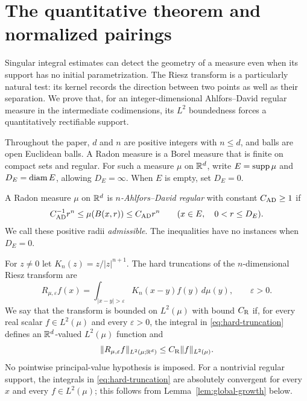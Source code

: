 \section{The quantitative theorem and normalized pairings}
\label{sec:background}

Singular integral estimates can detect the geometry of a measure even
when its support has no initial parametrization. The Riesz transform is
a particularly natural test: its kernel records the direction between
two points as well as their separation. We prove that, for an
integer-dimensional Ahlfors--David regular measure in the intermediate
codimensions, its $L^2$ boundedness forces a quantitatively rectifiable
support.

Throughout the paper, $d$ and $n$ are positive integers with $n\le d$,
and balls are open Euclidean balls. A Radon measure is
a Borel measure that is finite on compact sets and regular. For such a
measure $\mu$ on $\mathbb R^d$, write $E=\operatorname{supp}\mu$ and $D_E=\operatorname{diam} E$, allowing
$D_E=\infty$. When $E$ is empty, set $D_E=0$.

\begin{definition}\label{def:ad}
A Radon measure $\mu$ on $\mathbb R^d$ is \emph{$n$-Ahlfors--David regular}
with constant $C_{\rm AD}\ge1$ if
\[
 C_{\rm AD}^{-1}r^n\le\mu(B(x,r))\le C_{\rm AD}r^n
 \qquad(x\in E,\quad 0<r\le D_E).
\]
We call these positive radii \emph{admissible}. The inequalities have
no instances when $D_E=0$.
\end{definition}

For $z\ne0$ let $K_n(z)=z/|z|^{n+1}$. The hard truncations of the
$n$-dimensional Riesz transform are
\begin{equation}\label{eq:hard-truncation}
 R_{\mu,\varepsilon}f(x)
 =\int_{|x-y|>\varepsilon} K_n(x-y)f(y)\,d\mu(y),\qquad\varepsilon>0.
\end{equation}
We say that the transform is bounded on $L^2(\mu)$ with bound
$C_{\rm R}$ if, for every real scalar $f\in L^2(\mu)$ and every
$\varepsilon>0$, the integral in \eqref{eq:hard-truncation} defines an
$\mathbb R^d$-valued $L^2(\mu)$ function and
\begin{equation}\label{eq:riesz-bound}
 \|R_{\mu,\varepsilon}f\|_{L^2(\mu;\mathbb R^d)}
 \le C_{\rm R}\|f\|_{L^2(\mu)}.
\end{equation}
No pointwise principal-value hypothesis is imposed. For a nontrivial
regular support, the integrals in \eqref{eq:hard-truncation} are
absolutely convergent for every $x$ and every $f\in L^2(\mu)$;
this follows from Lemma~\ref{lem:global-growth} below.

